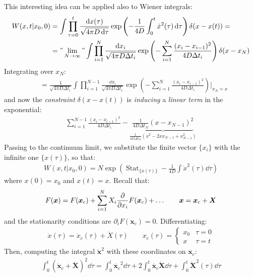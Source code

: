 \documentclass[../template.tex]{subfiles}
\begin{document}
This interesting idea can be applied also to Wiener integrals:
\begin{align*}
    W(x,t|x_0,0) &= \int \prod_{\tau = 0}^t \frac{\dd{x(\tau)}}{\sqrt{4 \pi D \dd{\tau}}} \exp\left(-\frac{1}{4D} \int_0^t \dot{x}^2 (\tau) \dd{\tau} \right) \delta(x-x(t)) = \\
    &=  "\lim_{N \to \infty}"  \int \prod_{i=1}^{N} \frac{\dd{x_i}}{\sqrt{4 \pi D \Delta t_i }} \exp\left(- \sum_{i=1}^N \frac{(x_i - x_{i-1})^2}{4 D \Delta t_i} \right)  \delta(x- x_N)
\end{align*}
Integrating over $x_N$:
\begin{align*}
    &= \frac{1}{\sqrt{4 \pi D \Delta t_i}} \int \prod_{i=1}^{N-1} \frac{\dd{x_i}}{\sqrt{4 \pi D \Delta t_i}} \exp\left(-\sum_{i=1}^N \frac{(x_i - x_{i-1})^2}{4 D \Delta t_i} \right) \Big|_{x_N = x} 
\end{align*} 
and now the \textit{constraint} $\delta(x - x(t))$ is \textit{inducing} a \textit{linear term} in the exponential:
\begin{align*}
    \sum_{i=1}^{N-1} \frac{(x_i - x_{i-1})^2}{4 D \Delta t_i}  - \underbrace{\frac{1}{4 D \Delta t_N} (x- x_{N-1})^2 }_{\displaystyle \frac{1}{4 D \Delta t_N} (x^2 - 2x x_{N-1} + x_{N-1}^2) } 
\end{align*}    
Passing to the continuum limit, we substitute the finite vector $\{x_i\}$ with the infinite one $\{x(\tau)\}$, so that:
\begin{align*}
    W(x,t|x_0,0) = N \exp\left( \operatorname{Stat}_{\{x(\tau)\}} -\frac{1}{4 D} \int \dot{x}^2 (\tau) \dd{\tau} \right)
\end{align*}  
where $x(0) = x_0$ and $x(t) = x$. Recall that:
\begin{align*}
    F(\bm{x}) = F(\bm{x}_c) + \sum_{i=1}^N X_i \pdv{x_i} F(\bm{x}_c) + \dots \qquad \bm{x} = \bm{x}_c + \bm{X}
\end{align*}  
and the stationarity conditions are $\partial_i F(\bm{x}_c) = 0$.
Differentiating:
\begin{align*}
    \dot{x}(\tau) = \dot{x}_c(\tau) + \dot{X} (\tau) \qquad x_c(\tau) = \begin{cases}
        x_0 & \tau = 0\\
        x & \tau = t
    \end{cases}
\end{align*}
Then, computing the integral $\bm{\dot{x}}^2$ with these coordinates  on $\bm{x}_c$: 
\begin{align*}
    \int_0^t (\dot{\bm{x}}_c + \dot{\bm{X}})^2 \dd{\tau} = \int_0^t \dot{\bm{x}_c}^2 \dd{\tau} + 2 \int_0^t \dot{\bm{x}_c} \dot{\bm{X}} \dd{\tau} + \int_0^t \dot{\bm{X}}^2 (\tau) \dd{\tau}
\end{align*}
\end{document}
